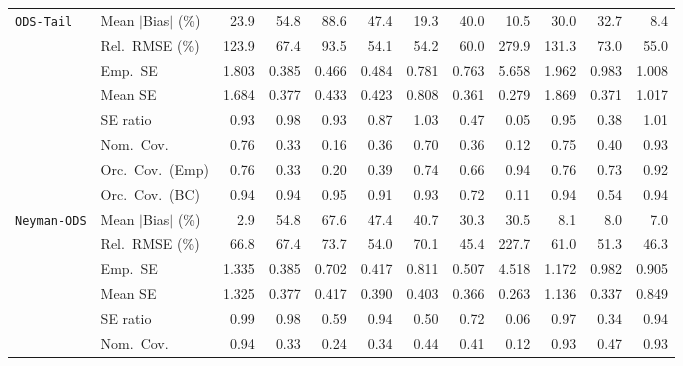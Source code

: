 \begin{landscape}
\begin{longtable}{llrrrrrrrrrr}
\addlinespace[2pt]
\quad \texttt{ODS-Tail} & Mean $|$Bias$|$ (\%) & 23.9 & 54.8 & 88.6 & 47.4 & \cellcolor{rankthree}19.3 & 40.0 & \cellcolor{ranktwo}10.5 & 30.0 & 32.7 & \cellcolor{rankone}8.4 \\
 & Rel.\ RMSE (\%) & 123.9 & 67.4 & 93.5 & \cellcolor{rankone}54.1 & \cellcolor{ranktwo}54.2 & 60.0 & 279.9 & 131.3 & 73.0 & \cellcolor{rankthree}55.0 \\
 & Emp.\ SE & 1.803 & 0.385 & 0.466 & 0.484 & 0.781 & 0.763 & 5.658 & 1.962 & 0.983 & 1.008 \\
 & Mean SE & 1.684 & 0.377 & 0.433 & 0.423 & 0.808 & 0.361 & 0.279 & 1.869 & 0.371 & 1.017 \\
 & SE ratio & 0.93 & \cellcolor{ranktwo}0.98 & 0.93 & 0.87 & \cellcolor{rankthree}1.03 & 0.47 & 0.05 & 0.95 & 0.38 & \cellcolor{rankone}1.01 \\
 & Nom.\ Cov. & \cellcolor{ranktwo}0.76 & 0.33 & 0.16 & 0.36 & 0.70 & 0.36 & 0.12 & \cellcolor{rankthree}0.75 & 0.40 & \cellcolor{rankone}0.93 \\
 & Orc.\ Cov.\ (Emp) & \cellcolor{rankthree}0.76 & 0.33 & 0.20 & 0.39 & 0.74 & 0.66 & \cellcolor{rankone}0.94 & \cellcolor{rankthree}0.76 & 0.73 & \cellcolor{ranktwo}0.92 \\
 & Orc.\ Cov.\ (BC) & \cellcolor{ranktwo}0.94 & \cellcolor{ranktwo}0.94 & \cellcolor{rankone}0.95 & 0.91 & \cellcolor{rankthree}0.93 & 0.72 & 0.11 & \cellcolor{ranktwo}0.94 & 0.54 & \cellcolor{ranktwo}0.94 \\
\addlinespace[2pt]
\quad \texttt{Neyman-ODS} & Mean $|$Bias$|$ (\%) & \cellcolor{rankone}2.9 & 54.8 & 67.6 & 47.4 & 40.7 & 30.3 & 30.5 & 8.1 & \cellcolor{rankthree}8.0 & \cellcolor{ranktwo}7.0 \\
 & Rel.\ RMSE (\%) & 66.8 & 67.4 & 73.7 & 54.0 & 70.1 & \cellcolor{rankone}45.4 & 227.7 & 61.0 & \cellcolor{rankthree}51.3 & \cellcolor{ranktwo}46.3 \\
 & Emp.\ SE & 1.335 & 0.385 & 0.702 & 0.417 & 0.811 & 0.507 & 4.518 & 1.172 & 0.982 & 0.905 \\
 & Mean SE & 1.325 & 0.377 & 0.417 & 0.390 & 0.403 & 0.366 & 0.263 & 1.136 & 0.337 & 0.849 \\
 & SE ratio & \cellcolor{rankone}0.99 & \cellcolor{ranktwo}0.98 & 0.59 & 0.94 & 0.50 & 0.72 & 0.06 & \cellcolor{rankthree}0.97 & 0.34 & 0.94 \\
 & Nom.\ Cov. & \cellcolor{rankone}0.94 & 0.33 & 0.24 & 0.34 & 0.44 & 0.41 & 0.12 & \cellcolor{ranktwo}0.93 & \cellcolor{rankthree}0.47 & \cellcolor{ranktwo}0.93 \\

\end{longtable}
\end{landscape}
